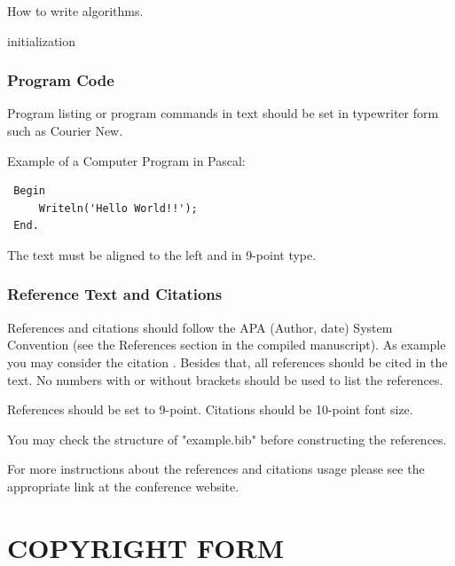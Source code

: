 \documentclass[a4paper,twoside]{article}
\begin{document}
\begin{algorithm}[!h]
 \caption{How to write algorithms.}
 initialization\;
\end{algorithm}


\bigskip
\subsubsection{Program Code}\label{subsubsec:program_code}

Program listing or program commands in text should be set in
typewriter form such as Courier New.

Example of a Computer Program in Pascal:

\begin{small}
\begin{verbatim}
 Begin
     Writeln('Hello World!!');
 End.
\end{verbatim}
\end{small}


The text must be aligned to the left and in 9-point type.

\subsubsection{Reference Text and Citations}

References and citations should follow the APA (Author, date)
System Convention (see the References section in the compiled
manuscript). As example you may consider the citation
\cite{Smith98}. Besides that, all references should be cited in the
text. No numbers with or without brackets should be used to list the
references.

References should be set to 9-point. Citations should be 10-point
font size.

You may check the structure of "example.bib" before constructing the
references.

For more instructions about the references and citations usage
please see the appropriate link at the conference website.

\section{\uppercase{Copyright Form}}
\end{document}
